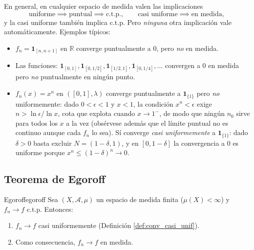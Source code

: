 \documentclass[11pt, a4paper]{article}
\begin{document}
\obs En general, en cualquier espacio de medida valen las implicaciones
$$ \text{uniforme} \implies \text{puntual} \implies \text{c.t.p.}, \qquad
   \text{casi uniforme} \implies \text{en medida}, $$
y la casi uniforme también implica c.t.p.
Pero \emph{ninguna} otra implicación vale automáticamente. Ejemplos típicos:
\begin{itemize}
    \item $f_n = \mathbf{1}_{[n, n+1]}$ en $\mathbb{R}$ converge puntualmente
     a 0, pero \emph{no} en medida.
    \item Las funciones: $\mathbf{1}_{[0,1]}, \mathbf{1}_{[0,1/2]},
    \mathbf{1}_{[1/2,1]}, \mathbf{1}_{[0,1/4]}, \dots$ convergen a 0 en medida pero \emph{no}
    puntualmente en ningún punto.
    \item $f_n(x) = x^n$ en $([0, 1], \lambda)$ converge puntualmente a $\mathbf{1}_{\{1\}}$
    pero \emph{no} uniformemente: dado $0 < \epsilon < 1$ y $x < 1$, la condición
    $x^n < \epsilon$ exige $n > \ln \epsilon / \ln x$, cota que explota cuando $x \to 1^-$, de
    modo que ningún $n_0$ sirve para todos los $x$ a la vez (obsérvese además que el límite
    puntual no es continuo aunque cada $f_n$ lo sea). Sí converge \emph{casi uniformemente} a
    $\mathbf{1}_{\{1\}}$: dado $\delta > 0$ basta excluir $N = (1 - \delta, 1)$, y en
    $[0, 1 - \delta]$ la convergencia a $0$ es uniforme porque $x^n \le (1 - \delta)^n \to 0$.
\end{itemize}

\subsection{Teorema de Egoroff}

\begin{teorema}{Egoroff}{egoroff}
Sea $(X, \mathcal{A}, \mu)$ un espacio de medida finita ($\mu(X) < \infty$) y $f_n \to f$ c.t.p.
Entonces:
\begin{enumerate}
    \item $f_n \to f$ casi uniformemente (Definición \ref{def:conv_casi_unif}).
    \item Como consecuencia, $f_n \to f$ en medida.
\end{enumerate}
\end{teorema}
\end{document}
